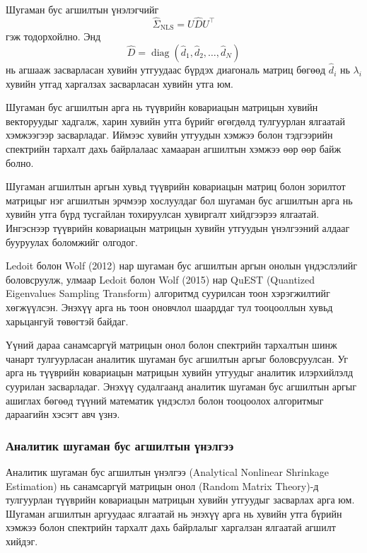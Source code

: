 Шугаман бус агшилтын үнэлэгчийг
\[
\widehat{\Sigma}_{\mathrm{NLS}}
=
U\widehat{D}U^{\top}
\]
гэж тодорхойлно. Энд
\[
\widehat{D}
=
\operatorname{diag}
(\widehat{d}_1,\widehat{d}_2,\ldots,\widehat{d}_N)
\]
нь агшааж засварласан хувийн утгуудаас бүрдэх диагональ матриц бөгөөд $\widehat{d}_i$ нь $\lambda_i$ хувийн утгад харгалзах засварласан хувийн утга юм.

Шугаман бус агшилтын арга нь түүврийн ковариацын матрицын хувийн векторуудыг хадгалж, харин хувийн утга бүрийг өгөгдөлд тулгуурлан ялгаатай хэмжээгээр засварладаг. Иймээс хувийн утгуудын хэмжээ болон тэдгээрийн спектрийн тархалт дахь байрлалаас хамааран агшилтын хэмжээ өөр өөр байж болно.

Шугаман агшилтын аргын хувьд түүврийн ковариацын матриц болон зорилтот матрицыг нэг агшилтын эрчмээр хослуулдаг бол шугаман бус агшилтын арга нь хувийн утга бүрд тусгайлан тохируулсан хувиргалт хийдгээрээ ялгаатай. Ингэснээр түүврийн ковариацын матрицын хувийн утгуудын үнэлгээний алдааг бууруулах боломжийг олгодог.

Ledoit болон Wolf (2012) нар шугаман бус агшилтын
аргын онолын үндэслэлийг боловсруулж, улмаар
Ledoit болон Wolf (2015) нар QuEST
(Quantized Eigenvalues Sampling Transform)
алгоритмд суурилсан тоон хэрэгжилтийг хөгжүүлсэн.
Энэхүү арга нь тоон оновчлол шаарддаг тул
тооцооллын хувьд харьцангуй төвөгтэй байдаг.

Үүний дараа \citet{ledoitwolf2020} санамсаргүй
матрицын онол болон спектрийн тархалтын
шинж чанарт тулгуурласан аналитик шугаман бус
агшилтын аргыг боловсруулсан. Уг арга нь
түүврийн ковариацын матрицын хувийн утгуудыг
аналитик илэрхийлэлд суурилан засварладаг.
Энэхүү судалгаанд аналитик шугаман бус
агшилтын аргыг ашиглах бөгөөд түүний
математик үндэслэл болон тооцоолох
алгоритмыг дараагийн хэсэгт авч үзнэ.




\subsubsection{Аналитик шугаман бус агшилтын үнэлгээ}

Аналитик шугаман бус агшилтын үнэлгээ
(Analytical Nonlinear Shrinkage Estimation) нь
санамсаргүй матрицын онол (Random Matrix Theory)-д
тулгуурлан түүврийн ковариацын матрицын хувийн
утгуудыг засварлах арга юм. Шугаман агшилтын
аргуудаас ялгаатай нь энэхүү арга нь хувийн
утга бүрийн хэмжээ болон спектрийн тархалт дахь
байрлалыг харгалзан ялгаатай агшилт хийдэг.

